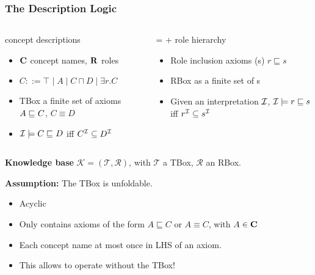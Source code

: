 \documentclass[smaller]{beamer}
\begin{document}
\begin{frame}
  \frametitle{The \elh{} Description Logic}
  \begin{columns}
    \begin{column}{0.5\textwidth}
      \el concept descriptions
      \begin{itemize}[<+->]
        \item \(\mathbf{C}\) \alert{concept names}, \(\mathbf{R}\) \alert{roles}
        \item \(C ::= \top \mid A \mid C \sqcap D \mid \exists{}r.C\)
        \item \alert{TBox} a finite set of axioms \(A \sqsubseteq_{\mathcal{}} C\), \(C \equiv D\)
        \item \(\mathcal{I} \models C \sqsubseteq_{\mathcal{}} D\) iff \(C^{\mathcal{I}} \subseteq D^{\mathcal{I}}\)
      \end{itemize}
    \end{column}
    \begin{column}{0.5\textwidth}
      \elh = \el + \alert{role hierarchy}
      \begin{itemize}[<+->]
        \item \alert{Role inclusion axioms} (\ria{}s) \(r \sqsubseteq s\)
        \item \alert{RBox} as a finite set of \ria{}s
        \item Given an interpretation \(\mathcal{I}\), \(\mathcal{I} \models r \sqsubseteq s\) iff \(r^{\mathcal{I}} \subseteq s^{\mathcal{I}}\)
      \end{itemize}
    \end{column}
  \end{columns}
  \pause
  \textbf{Knowledge base} \(\mathcal{K} = (\mathcal{T}, \mathcal{R})\), with \(\mathcal{T}\) a TBox, \(\mathcal{R}\) an RBox.
  
  \pause
  \textbf{Assumption:} The TBox is \alert{unfoldable}.
  \begin{itemize}[<+->]
    \item Acyclic
    \item Only contains axioms of the form
    \(A \sqsubseteq C\) or \(A \equiv C\), with \(A \in \mathbf{C}\)
    \item Each concept name at most once in LHS of an axiom.
    \item This allows to operate without the TBox!
  \end{itemize}
\end{frame}
\end{document}
